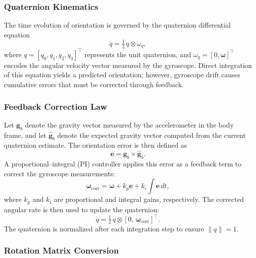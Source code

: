 \documentclass[10pt]{article}
\begin{document}
\subsubsection{Quaternion Kinematics}

The time evolution of orientation is governed by the quaternion differential equation
\begin{equation}
\dot{q} = \tfrac{1}{2}\, q \otimes \omega_q,
\end{equation}
where \( q = [q_0, q_1, q_2, q_3]^\top \) represents the unit quaternion, and
\(\omega_q = [0, \boldsymbol{\omega}]^\top\) encodes the angular velocity vector measured by the gyroscope. Direct integration of this equation yields a predicted orientation; however, gyroscope drift causes cumulative errors that must be corrected through feedback.

\subsubsection{Feedback Correction Law}

Let \(\mathbf{g}_b\) denote the gravity vector measured by the accelerometer in the body frame, and let \(\hat{\mathbf{g}}_b\) denote the expected gravity vector computed from the current quaternion estimate. The orientation error is then defined as
\begin{equation}
\mathbf{e} = \mathbf{g}_b \times \hat{\mathbf{g}}_b.
\end{equation}
A proportional–integral (PI) controller applies this error as a feedback term to correct the gyroscope measurements:
\begin{equation}
\boldsymbol{\omega}_{\text{corr}} = \boldsymbol{\omega} + k_p \mathbf{e} + k_i \!\int \mathbf{e}\,dt,
\end{equation}
where \(k_p\) and \(k_i\) are proportional and integral gains, respectively. The corrected angular rate is then used to update the quaternion:
\begin{equation}
\dot{q} = \tfrac{1}{2}\, q \otimes [0,\, \boldsymbol{\omega}_{\text{corr}}]^\top.
\end{equation}
The quaternion is normalized after each integration step to ensure \(\|q\| = 1\).

\subsubsection{Rotation Matrix Conversion}
\end{document}
